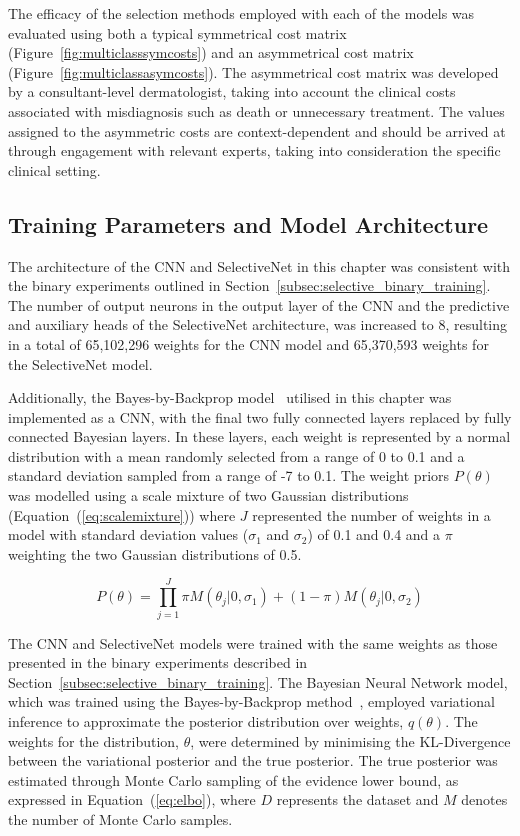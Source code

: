 The efficacy of the selection methods employed with each of the models was evaluated using both a typical symmetrical cost matrix (Figure~\ref{fig:multiclasssymcosts}) and an asymmetrical cost matrix (Figure~\ref{fig:multiclassasymcosts}). The asymmetrical cost matrix was developed by a consultant-level dermatologist, taking into account the clinical costs associated with misdiagnosis such as death or unnecessary treatment. The values assigned to the asymmetric costs are context-dependent and should be arrived at through engagement with relevant experts, taking into consideration the specific clinical setting.

\subsection{Training Parameters and Model Architecture}
The architecture of the CNN and SelectiveNet in this chapter was consistent with the binary experiments outlined in Section~\ref{subsec:selective_binary_training}. The number of output neurons in the output layer of the CNN and the predictive and auxiliary heads of the SelectiveNet architecture, was increased to 8, resulting in a total of 65,102,296 weights for the CNN model and 65,370,593 weights for the SelectiveNet model.

Additionally, the Bayes-by-Backprop model~\citep{blundell2015weight} utilised in this chapter was implemented as a CNN, with the final two fully connected layers replaced by fully connected Bayesian layers. In these layers, each weight is represented by a normal distribution with a mean randomly selected from a range of 0 to 0.1 and a standard deviation sampled from a range of -7 to 0.1. The weight priors $P(\theta)$ was modelled using a scale mixture of two Gaussian distributions (Equation~(\ref{eq:scalemixture})) where $J$ represented the number of weights in a model with standard deviation values ($\sigma_1$ and $\sigma_2$) of 0.1 and 0.4 and a $\pi$ weighting the two Gaussian distributions of 0.5. 

\begin{equation}
	P(\theta) = \prod^J_{j=1}\pi M(\theta_j|0,\sigma_1)+(1-\pi)M(\theta_j|0,\sigma_2)
	\label{eq:scalemixture}
\end{equation}

The CNN and SelectiveNet models were trained with the same weights as those presented in the binary experiments described in Section~\ref{subsec:selective_binary_training}. The Bayesian Neural Network model, which was trained using the Bayes-by-Backprop method~\citep{blundell2015weight}, employed variational inference to approximate the posterior distribution over weights, $q(\theta)$. The weights for the distribution, $\theta$, were determined by minimising the KL-Divergence between the variational posterior and the true posterior. The true posterior was estimated through Monte Carlo sampling of the evidence lower bound, as expressed in Equation~(\ref{eq:elbo}), where $D$ represents the dataset and $M$ denotes the number of Monte Carlo samples.

